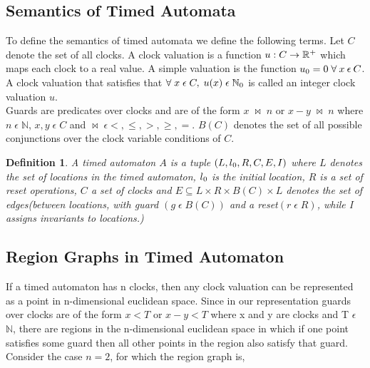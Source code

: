 \documentclass[12pt,letterpaper]{report}
\newtheorem{definition}{Definition}
\begin{document}
\subsection{Semantics of Timed Automata}
To define the semantics of timed automata we define the following terms. Let $C$ denote the set of all clocks. A clock valuation is a function $u: C \rightarrow \mathbb{R}\textsuperscript{+}$ which maps each clock to a real value. A simple valuation is the function $u\textsubscript{0} = 0\;  \forall\: x\: \epsilon\: C $. A clock valuation that satisfies that $\forall \; x \; \epsilon \; C, \; u(x) \; \epsilon \; \mathbb{N}\textsubscript{0}$ is called an integer clock valuation $u$.
\\
\indent Guards are predicates over clocks and are of the form $x \; \bowtie\; n$ or $x - y\; \bowtie\; n$ where $n \; \epsilon \; \mathbb{N}$, $x,y\; \epsilon \; C$ and $\bowtie\; \epsilon {<,\leq,>,\geq,=}$. $B(C)$ denotes the set of all possible conjunctions over the clock variable conditions of $C$. 
\\
\begin{definition}
A timed automaton $A$ is a tuple $(L,l\textsubscript{0},R,C,E,I)$ where $L$ denotes the set of locations in the timed automaton, $l\textsubscript{0}$ is the initial location, $R$ is a set of reset operations, $C$ a set of clocks and $E\subseteq L \times
R \times B(C) \times L$ denotes the set of edges(between locations, with guard $(g\; \epsilon \; B(C))$ and a reset$(r\; \epsilon \; R)$, while I assigns invariants to locations.)  
\end{definition} 

\subsection{Region Graphs in Timed Automaton}
 If a timed automaton has n clocks, then any clock valuation can be represented as a point in n-dimensional euclidean space. Since in our representation 
guards over clocks are of the form $ x < T $ or $ x - y < T $ where x and y are clocks and T $\epsilon$ $\mathbb{N}$, there are regions in the n-dimensional euclidean space in which if one point satisfies some guard then all other points in the region also satisfy that guard. Consider the case $ n = 2 $, for which the region graph is,
\end{document}
